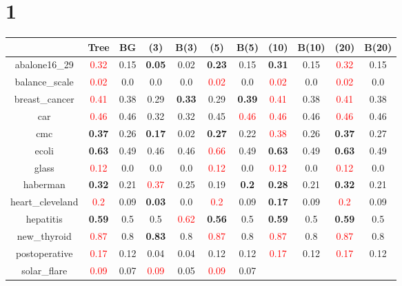 \documentclass{article}%
\begin{document}
\section*{1}%
\begin{tabular}{c|cccccccccc}%
\hline%
&Tree&BG&(3)&B(3)&(5)&B(5)&(10)&B(10)&(20)&B(20)\\%
\hline%
abalone16\_29&\textcolor{red}{ 
0.32
}&0.15&\textbf{0.05}&0.02&\textbf{0.23}&0.15&\textbf{0.31}&0.15&\textcolor{red}{ 
0.32
}&0.15\\%
\hline%
balance\_scale&\textcolor{red}{ 
0.02
}&0.0&0.0&0.0&\textcolor{red}{ 
0.02
}&0.0&\textcolor{red}{ 
0.02
}&0.0&\textcolor{red}{ 
0.02
}&0.0\\%
\hline%
breast\_cancer&\textcolor{red}{ 
0.41
}&0.38&0.29&\textbf{0.33}&0.29&\textbf{0.39}&\textcolor{red}{ 
0.41
}&0.38&\textcolor{red}{ 
0.41
}&0.38\\%
\hline%
car&\textcolor{red}{ 
0.46
}&0.46&0.32&0.32&0.45&\textcolor{red}{ 
0.46
}&\textcolor{red}{ 
0.46
}&0.46&\textcolor{red}{ 
0.46
}&0.46\\%
\hline%
cmc&\textbf{0.37}&0.26&\textbf{0.17}&0.02&\textbf{0.27}&0.22&\textcolor{red}{ 
0.38
}&0.26&\textbf{0.37}&0.27\\%
\hline%
ecoli&\textbf{0.63}&0.49&0.46&0.46&\textcolor{red}{ 
0.66
}&0.49&\textbf{0.63}&0.49&\textbf{0.63}&0.49\\%
\hline%
glass&\textcolor{red}{ 
0.12
}&0.0&0.0&0.0&\textcolor{red}{ 
0.12
}&0.0&\textcolor{red}{ 
0.12
}&0.0&\textcolor{red}{ 
0.12
}&0.0\\%
\hline%
haberman&\textbf{0.32}&0.21&\textcolor{red}{ 
0.37
}&0.25&0.19&\textbf{0.2}&\textbf{0.28}&0.21&\textbf{0.32}&0.21\\%
\hline%
heart\_cleveland&\textcolor{red}{ 
0.2
}&0.09&\textbf{0.03}&0.0&\textcolor{red}{ 
0.2
}&0.09&\textbf{0.17}&0.09&\textcolor{red}{ 
0.2
}&0.09\\%
\hline%
hepatitis&\textbf{0.59}&0.5&0.5&\textcolor{red}{ 
0.62
}&\textbf{0.56}&0.5&\textbf{0.59}&0.5&\textbf{0.59}&0.5\\%
\hline%
new\_thyroid&\textcolor{red}{ 
0.87
}&0.8&\textbf{0.83}&0.8&\textcolor{red}{ 
0.87
}&0.8&\textcolor{red}{ 
0.87
}&0.8&\textcolor{red}{ 
0.87
}&0.8\\%
\hline%
postoperative&\textcolor{red}{ 
0.17
}&0.12&0.04&0.04&0.12&0.12&\textcolor{red}{ 
0.17
}&0.12&\textcolor{red}{ 
0.17
}&0.12\\%
\hline%
solar\_flare&\textcolor{red}{ 
0.09
}&0.07&\textcolor{red}{ 
0.09
}&0.05&\textcolor{red}{ 
0.09
}&0.07&\textcolor{red}{ 
}
\end{tabular}
\end{document}

